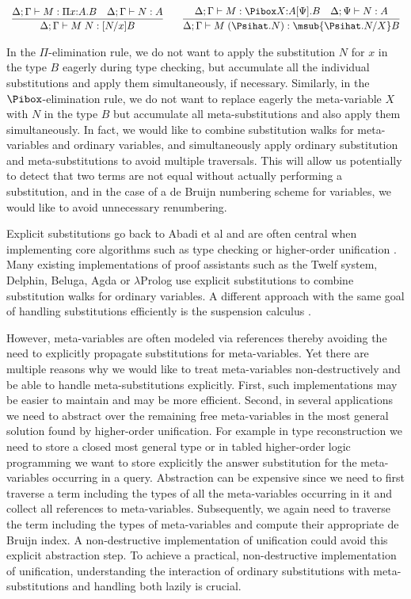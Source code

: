 \documentclass[copyright,creativecommons]{eptcs}
\begin{document}
\[
\begin{array}{l}
\infer{\Delta ; \Gamma \vdash M\;N : [N/x]B}{
\Delta ; \Gamma \vdash M : \Pi x{:}A.B  &
\Delta ; \Gamma \vdash N : A}
\quad \quad  
\infer{\Delta ; \Gamma \vdash M\;(\Psihat.N) : \msub{\Psihat.N/X}B}{
\Delta ; \Gamma \vdash M : \Pibox X{:}A[\Psi].B  &
\Delta ; \Psi \vdash N : A}
\end{array}
\]

In the $\Pi$-elimination rule, we do not want to apply
the substitution $N$ for $x$ in the type $B$ eagerly during type
checking, but accumulate all the individual substitutions and apply
them simultaneously, if necessary. Similarly, in the
$\Pibox$-elimination rule, we do not want to replace eagerly the
meta-variable $X$ with $N$ in the type $B$ but accumulate all
meta-substitutions and also apply them simultaneously. 
In fact, we would like to combine substitution walks for
meta-variables and ordinary variables, and simultaneously apply
ordinary substitution and meta-substitutions to avoid multiple
traversals. This will allow us potentially to detect that two terms
are not equal without actually performing a substitution, and in the
case of a de Bruijn numbering scheme for variables, we would like to
avoid unnecessary renumbering.  

Explicit substitutions go back to Abadi et al
\cite{abadiCardelliCurienLevy:jfp91} and
are often central when implementing core algorithms such as type
checking or  higher-order unification 
\cite{dowekHardinKirchner:infcomp00}. 
Many existing implementations of proof assistants such as the Twelf
system, Delphin, Beluga, Agda or $\lambda$Prolog use explicit
substitutions to combine substitution walks for ordinary
variables. A different approach with the same goal of handling
substitutions efficiently is the suspension calculus 
\cite{Nadathur:TCS98,liangNadathurQi:jar05}.

 However, meta-variables are often modeled via references
thereby avoiding the need to explicitly propagate substitutions for meta-variables. Yet
there are multiple reasons why we would like to treat meta-variables
non-destructively and be able to handle meta-substitutions
explicitly. First, such implementations may be easier to
maintain and may be more efficient. Second, in several applications
we need to abstract over the remaining free meta-variables in the most
general solution found by higher-order unification.  For example in type
reconstruction we need to store a closed most general type or  in tabled
higher-order logic programming \cite{Pientka03phd} we want to
store explicitly the answer substitution for the meta-variables occurring in a
query. Abstraction can be expensive since we need to first
traverse a term including the types of all the meta-variables
occurring in it and  collect all references to
meta-variables. Subsequently, we again need to traverse the term
including the types of meta-variables and compute their appropriate de
Bruijn index.  A non-destructive implementation of unification could
avoid this explicit abstraction step. To achieve a practical,
non-destructive implementation of unification, understanding the interaction of
ordinary substitutions with meta-substitutions and handling both
lazily is crucial.
\end{document}
